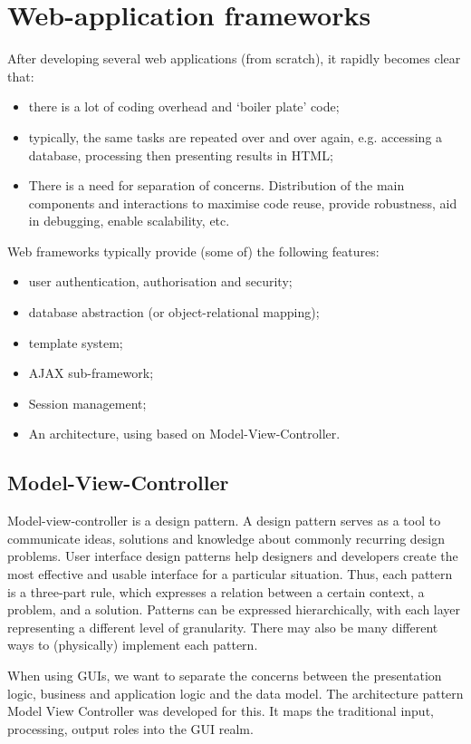 \documentclass[a4paper, openany]{memoir}
\begin{document}
\section{Web-application frameworks}
After developing several web applications (from scratch), it rapidly becomes clear that:
\begin{itemize}
    \item there is a lot of coding overhead and `boiler plate' code;
    \item typically, the same tasks are repeated over and over again, e.g. accessing a database, processing then presenting results in HTML;
    \item There is a need for separation of concerns. Distribution of the main components and interactions to maximise code reuse, provide robustness, aid in debugging, enable scalability, etc.
\end{itemize}
Web frameworks typically provide (some of) the following features:
\begin{itemize}
    \item user authentication, authorisation and security;
    \item database abstraction (or object-relational mapping);
    \item template system;
    \item AJAX sub-framework;
    \item Session management;
    \item An architecture, using based on Model-View-Controller.
\end{itemize}

\subsection{Model-View-Controller}
Model-view-controller is a design pattern. A design pattern serves as a tool to communicate ideas, solutions and knowledge about commonly recurring design problems. User interface design patterns help designers and developers create the most effective and usable interface for a particular situation. Thus, each pattern is a three-part rule, which expresses a relation between a certain context, a problem, and a solution. Patterns can be expressed hierarchically, with each layer representing a different level of granularity. There may also be many different ways to (physically) implement each pattern.

When using GUIs, we want to separate the concerns between the presentation logic, business and application logic and the data model. The architecture pattern Model View Controller was developed for this. It maps the traditional input, processing, output roles into the GUI realm.
\end{document}
